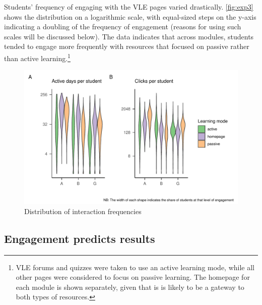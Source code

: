 \documentclass[
  english,
  man,mask,floatsintext]{apa6}
\begin{document}
Students' frequency of engaging with the VLE pages varied drastically. \autoref{fig:exp3} shows the distribution on a logarithmic scale, with equal-sized steps on the y-axis indicating a doubling of the frequency of engagement (reasons for using such scales will be discussed below). The data indicates that across modules, students tended to engage more frequently with resources that focused on passive rather than active learning.\footnote{VLE forums and quizzes were taken to use an active learning mode, while all other pages were considered to focus on passive learning. The homepage for each module is shown separately, given that is is likely to be a gateway to both types of resources.}

\begin{figure}
\centering
\includegraphics{Assigment-2---OU-data_files/figure-latex/unnamed-chunk-4-1.pdf}
\caption{\label{fig:unnamed-chunk-4}Distribution of interaction frequencies \label{fig:exp3}}
\end{figure}

\hypertarget{engagement-predicts-results}{%
\subsection{Engagement predicts results}\label{engagement-predicts-results}}
\end{document}
